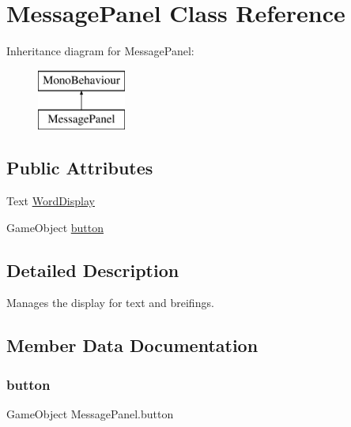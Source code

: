 \hypertarget{class_message_panel}{}\section{Message\+Panel Class Reference}
\label{class_message_panel}
Inheritance diagram for Message\+Panel\+:\begin{figure}[H]
\begin{center}
\leavevmode
\includegraphics[height=2.000000cm]{class_message_panel}
\end{center}
\end{figure}
\subsection*{Public Attributes}
\begin{DoxyCompactItemize}
\item 
Text \hyperlink{class_message_panel_a8b8f813b410d2e40ff070399c7a964cb}{Word\+Display}
\item 
Game\+Object \hyperlink{class_message_panel_a7b8a8ec70900e2bfb62c29afb388f5ac}{button}
\end{DoxyCompactItemize}


\subsection{Detailed Description}
Manages the display for text and breifings. 

\subsection{Member Data Documentation}
\mbox{\label{class_message_panel_a7b8a8ec70900e2bfb62c29afb388f5ac}} 
\subsubsection{\texorpdfstring{button}{button}}
{\footnotesize\ttfamily Game\+Object Message\+Panel.\+button}

\mbox{\label{class_message_panel_a8b8f813b410d2e40ff070399c7a964cb}} 
